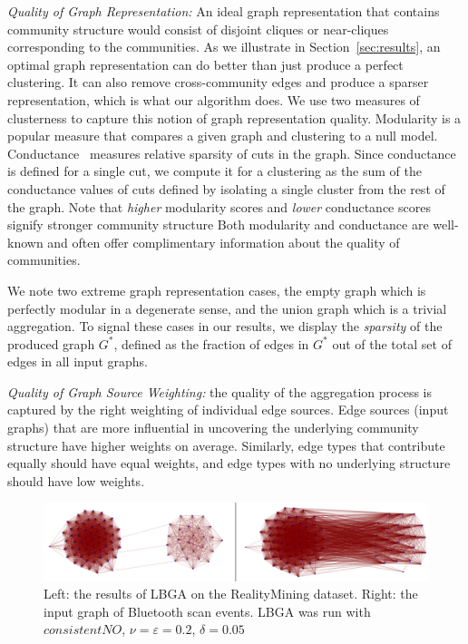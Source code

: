 \documentclass{article}
\begin{document}
{\em Quality of Graph Representation:} An ideal graph representation that
contains community structure would consist of disjoint cliques or near-cliques
corresponding to the communities. As we illustrate in
Section~\ref{sec:results}, an optimal graph representation can do better than
just produce a perfect clustering. It can also remove cross-community edges and
produce a sparser representation, which is what our algorithm does. We use two
measures of clusterness to capture this notion of graph representation quality.
Modularity \cite{Newman06} is a popular measure that compares a given graph and
clustering to a null model. Conductance~\cite{Leskovec2008,Gleich2012} measures
relative sparsity of cuts in the graph. Since conductance is defined for a
single cut, we compute it for a clustering as the sum of the conductance values
of cuts defined by isolating a single cluster from the rest of the graph. Note
that \emph{higher} modularity scores and \emph{lower} conductance scores
signify stronger community structure Both modularity and conductance are
well-known and often offer complimentary information about the quality of
communities.
 
We note two extreme graph representation cases, the empty graph which is
perfectly modular in a degenerate sense, and the union graph which is a trivial
aggregation. To signal these cases in our results, we display the
\emph{sparsity} of the produced graph $G^*$, defined as the fraction of edges
in $G^*$ out of the total set of edges in all input graphs. 

{\em Quality of Graph Source Weighting:} the quality of the aggregation process
is captured by the right weighting of individual edge sources. Edge sources (input
graphs) that are more influential in uncovering the underlying community
structure have higher weights on average. Similarly, edge types that contribute
equally should have equal weights, and edge types with no underlying structure
should have low weights.


\begin{figure}[t]
\begin{centering}
\includegraphics[width=\columnwidth]{figures/reality-mining-comparison.pdf}
\par\end{centering}
\caption{Left: the results of LBGA on the RealityMining dataset. Right: the
input graph of Bluetooth scan events. LBGA was run with $consistentNO$, $\nu =
\varepsilon = 0.2$, $\delta = 0.05$} 
\label{fig:reality-mining-comparison}
\end{figure}
\end{document}
